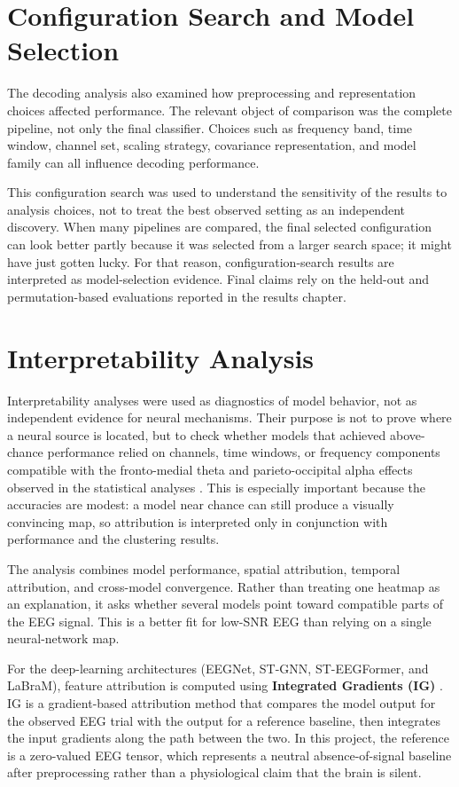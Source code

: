 \documentclass[11pt,a4paper,chapterprefix=false,parskip=false]{scrreprt}
\begin{document}
\section{Configuration Search and Model Selection}
The decoding analysis also examined how preprocessing and representation choices affected performance. The relevant object of comparison was the complete pipeline, not only the final classifier. Choices such as frequency band, time window, channel set, scaling strategy, covariance representation, and model family can all influence decoding performance.

This configuration search was used to understand the sensitivity of the results to analysis choices, not to treat the best observed setting as an independent discovery. When many pipelines are compared, the final selected configuration can look better partly because it was selected from a larger search space; it might have just gotten lucky. For that reason, configuration-search results are interpreted as model-selection evidence. Final claims rely on the held-out and permutation-based evaluations reported in the results chapter.

\section{Interpretability Analysis}
Interpretability analyses were used as diagnostics of model behavior, not as independent evidence for neural mechanisms. Their purpose is not to prove where a neural source is located, but to check whether models that achieved above-chance performance relied on channels, time windows, or frequency components compatible with the fronto-medial theta and parieto-occipital alpha effects observed in the statistical analyses \citep{kobler_interpretation_2021, zhou_interpretable_2023}. This is especially important because the accuracies are modest: a model near chance can still produce a visually convincing map, so attribution is interpreted only in conjunction with performance and the clustering results.

The analysis combines model performance, spatial attribution, temporal attribution, and cross-model convergence. Rather than treating one heatmap as an explanation, it asks whether several models point toward compatible parts of the EEG signal. This is a better fit for low-SNR EEG than relying on a single neural-network map.

For the deep-learning architectures (EEGNet, ST-GNN, ST-EEGFormer, and LaBraM), feature attribution is computed using \textbf{Integrated Gradients (IG)} \citep{sundararajan_axiomatic_2017}. IG is a gradient-based attribution method that compares the model output for the observed EEG trial with the output for a reference baseline, then integrates the input gradients along the path between the two. In this project, the reference is a zero-valued EEG tensor, which represents a neutral absence-of-signal baseline after preprocessing rather than a physiological claim that the brain is silent.
\end{document}
